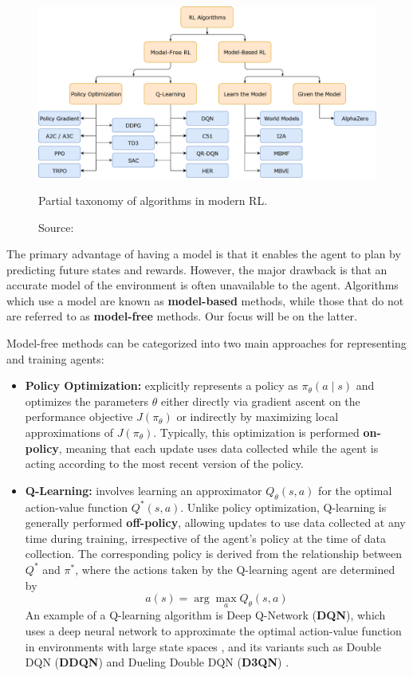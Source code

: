 \begin{figure}[h]
    \centering
    \includegraphics[width=.8\textwidth]{figures/ch3/4.rlalg.png}
    \caption{Partial taxonomy of algorithms in modern RL.}
    \vspace{-10px}
    \caption*{\scriptsize{Source: \cite{openaiPartKinds}}}
    \label{fig:mdp}
\end{figure}

The primary advantage of having a model is that it enables the agent
to plan by predicting future states and rewards.
However, the major drawback is that an accurate model of the environment
is often unavailable to the agent.
Algorithms which use a model are known as \textbf{model-based} methods,
while those that do not are referred to as \textbf{model-free} methods.
Our focus will be on the latter.

Model-free methods can be categorized into two main approaches
for representing and training agents:
\begin{itemize}
    \item \textbf{Policy Optimization:} explicitly represents a policy
    as \( \pi_{\theta}(a \mid s) \) and optimizes the parameters \( \theta \)
    either directly via gradient ascent on the performance objective
    \( J(\pi_{\theta}) \) or indirectly by maximizing local approximations
    of \( J(\pi_{\theta}) \).
    Typically, this optimization is performed \textbf{on-policy},
    meaning that each update uses data collected while the agent is acting
    according to the most recent version of the policy.

    \item \textbf{Q-Learning:} involves learning an approximator
    \( Q_{\theta}(s,a) \) for the optimal action-value function \( Q^*(s,a) \).
    Unlike policy optimization, Q-learning is generally performed \textbf{off-policy},
    allowing updates to use data collected at any time during training,
    irrespective of the agent's policy at the time of data collection.
    The corresponding policy is derived from the relationship between
    \( Q^* \) and \( \pi^* \), where the actions taken by the Q-learning
    agent are determined by
    \begin{equation}
    a(s) = \arg \max_a Q_{\theta}(s,a)
    \end{equation}
    An example of a Q-learning algorithm is Deep Q-Network (\textbf{DQN}),
    which uses a deep neural network to approximate the optimal action-value
    function in environments with large state spaces \cite{dqn},
    and its variants such as Double DQN (\textbf{DDQN})
    \cite{ddqn} and
    Dueling Double DQN (\textbf{D3QN}) \cite{d3qn}.

\end{itemize}

